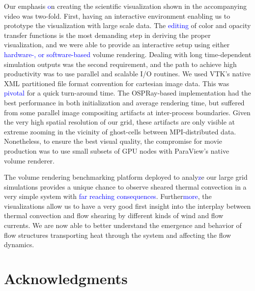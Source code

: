 \documentclass[5p,times]{elsarticle}
\begin{document}
Our emphasis \textcolor{blue}{o}n creating the scientific visualization shown in the accompanying video \cite{fav18} was two-fold. 
First, having an interactive environment enabling us to prototype the visualization with large scale data. The \textcolor{blue}{editing} of color and opacity transfer functions is the most demanding step in
deriving the proper visualization, and we were able to provide an interactive setup using either \textcolor{blue}{hardware-, or software-based} volume rendering. Dealing with long time-dependent simulation outputs was the second requirement, and the path to achieve high productivity was to use parallel and scalable I/O routines. We used VTK's native XML partitioned file format convention for cartesian image data. This was \textcolor{blue}{pivotal} for a quick turn-around time. The OSPRay-based implementation had the best performance in both initialization and average rendering time, but suffered from some parallel image compositing artifacts at inter-process boundaries. Given the very high spatial resolution of our grid, these artifacts are only visible at extreme zooming in the vicinity of ghost-cells between MPI-distributed data. Nonetheless, to ensure the best visual quality, the compromise for movie production was to use small subsets of GPU nodes with ParaView's native volume renderer.

The volume rendering benchmarking platform deployed to analy\textcolor{blue}{z}e our large grid simulations provides a unique chance to observe sheared thermal convection in a very simple system with \textcolor{blue}{far reaching consequences}. Further\textcolor{blue}{more}, the visualizations allow us to have a very good first insight into the interplay between thermal convection and flow shearing by different kinds of wind and flow currents. We are now able to better understand the emergence and behavior of flow structures transporting heat through the system and affecting the flow dynamics.




\section*{Acknowledgments}
\end{document}
